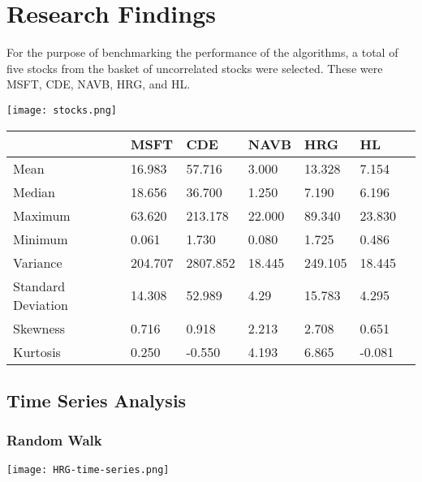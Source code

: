 \chapter{Research Findings}
For the purpose of benchmarking the performance of the algorithms, a total of five stocks from the basket of uncorrelated stocks were selected. These were MSFT, CDE, NAVB, HRG, and HL. 

\begin{center}
    \texttt{[image: stocks.png]}
    \label{fig:nonfloat}
\end{center}

\begin{center}
    \begin{tabular}{ | l | l | l | | l | l | l | p{5cm} |}
    \hline
     & MSFT & CDE & NAVB & HRG & HL \\ \hline
    Mean & 16.983 & 57.716 & 3.000 & 13.328 & 7.154 \\ \hline
    Median & 18.656 & 36.700 & 1.250 & 7.190 & 6.196 \\ \hline
    Maximum & 63.620 & 213.178 & 22.000 & 89.340 & 23.830 \\ \hline
    Minimum & 0.061 & 1.730 & 0.080 & 1.725 & 0.486 \\ \hline
    Variance & 204.707 & 2807.852 & 18.445 & 249.105 & 18.445 \\ \hline
    Standard Deviation & 14.308 & 52.989 & 4.29 & 15.783 & 4.295 \\ \hline
    Skewness & 0.716 & 0.918 & 2.213 & 2.708 & 0.651 \\ \hline
    Kurtosis & 0.250 & -0.550 & 4.193 & 6.865 & -0.081 \\ \hline
    \hline
    \end{tabular}
    \label{table:nonfloat}
\end{center}

\section{Time Series Analysis}

\subsection{Random Walk}

\begin{center}
    \texttt{[image: HRG-time-series.png]}
    \label{fig:nonfloat}
\end{center}

